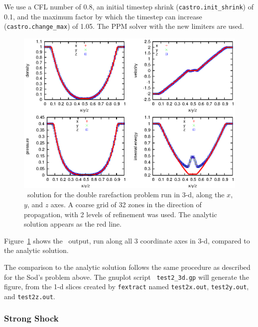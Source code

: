 We use a CFL number of 0.8, an initial
timestep shrink ({\tt castro.init\_shrink}) of 0.1, and the maximum factor by which
the timestep can increase ({\tt castro.change\_max}) of 1.05.  The PPM
solver with the new limiters are used.
\begin{figure}[h]
\centering
\includegraphics[width=5.0in]{test2_3d}
\caption{\label{fig:test2} \castro\ solution for the double rarefaction
  problem run in 3-d, along the $x$, $y$, and $z$ axes.  A coarse grid
  of 32 zones in the direction of propagation, with 2 levels of
  refinement was used.  The analytic solution appears as the red
  line.}
\end{figure}

Figure~\ref{fig:test2} shows the \castro\ output, run along all 3
coordinate axes in 3-d, compared to the analytic solution.  

The comparison to the analytic solution follows the same procedure as
described for the Sod's problem above.  The gnuplot script {\tt
  test2\_3d.gp} will generate the figure, from the 1-d slices created by
{\tt fextract} named {\tt test2x.out}, {\tt test2y.out}, and {\tt test2z.out}.

\subsubsection{Strong Shock}

